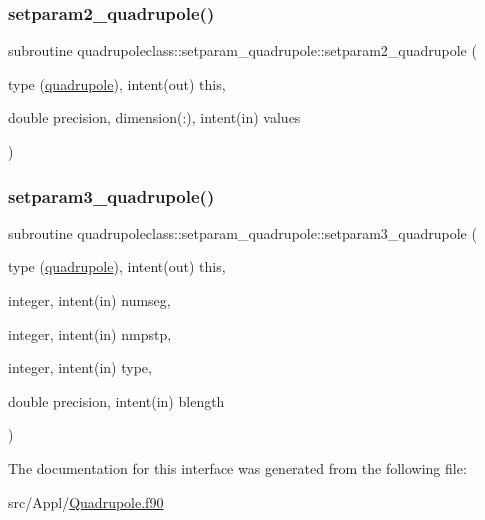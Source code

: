 \mbox{\label{interfacequadrupoleclass_1_1setparam__quadrupole_a0afeab566ad2a8d00552ba6cd402943d}} 
\subsubsection{\texorpdfstring{setparam2\_quadrupole()}{setparam2\_quadrupole()}}
{\footnotesize\ttfamily subroutine quadrupoleclass\+::setparam\+\_\+quadrupole\+::setparam2\+\_\+quadrupole (\begin{DoxyParamCaption}\item[{type (\mbox{\hyperlink{namespacequadrupoleclass_structquadrupoleclass_1_1quadrupole}{quadrupole}}), intent(out)}]{this,  }\item[{double precision, dimension(\+:), intent(in)}]{values }\end{DoxyParamCaption})}

\mbox{\label{interfacequadrupoleclass_1_1setparam__quadrupole_a9efeed4d7a1e905ae01a5efa85c514cf}} 
\subsubsection{\texorpdfstring{setparam3\_quadrupole()}{setparam3\_quadrupole()}}
{\footnotesize\ttfamily subroutine quadrupoleclass\+::setparam\+\_\+quadrupole\+::setparam3\+\_\+quadrupole (\begin{DoxyParamCaption}\item[{type (\mbox{\hyperlink{namespacequadrupoleclass_structquadrupoleclass_1_1quadrupole}{quadrupole}}), intent(out)}]{this,  }\item[{integer, intent(in)}]{numseg,  }\item[{integer, intent(in)}]{nmpstp,  }\item[{integer, intent(in)}]{type,  }\item[{double precision, intent(in)}]{blength }\end{DoxyParamCaption})}



The documentation for this interface was generated from the following file\+:\begin{DoxyCompactItemize}
\item 
src/\+Appl/\mbox{\hyperlink{_quadrupole_8f90}{Quadrupole.\+f90}}\end{DoxyCompactItemize}
